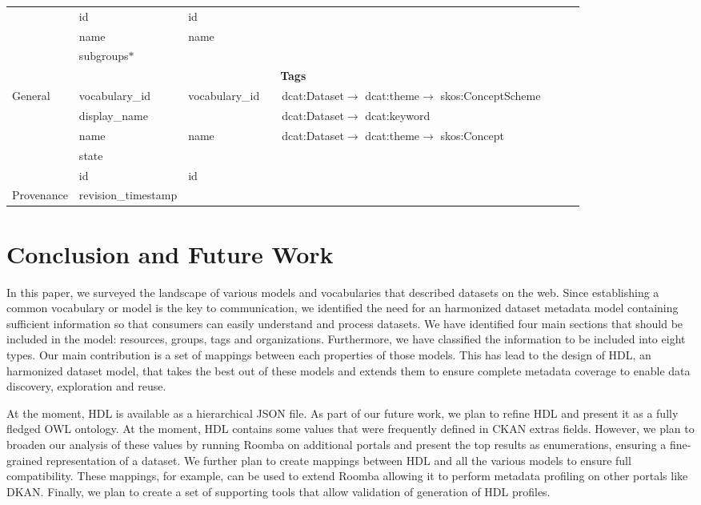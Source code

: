 \documentclass[runningheads,a4paper]{../../Tools/LaTEX/llncs}
\begin{document}
{\begin{landscape}
{\begin{longtable}{|p{1cm}|m{3.1cm}|m{2.4cm}|m{2.5cm}|p{3.8cm}|m{3.8cm}|m{6.5cm}|m{2.5cm}|}
\cline{2-8}
 & id & id &  &  &  &  & \tabularnewline
\cline{2-8}
 & name & name &  &  &  &  & \tabularnewline
\cline{2-8}
 & subgroups$\ast$ &  &  &  &  &  & \tabularnewline
\hline
\multicolumn{8}{|c|}{\cellcolor{blue!25}\textbf{Tags}}\tabularnewline
\hline
\multirow{5}{2cm}{General} & vocabulary\_id & vocabulary\_id &  & dcat:Dataset$\rightarrow$ dcat:theme$\rightarrow$ skos:ConceptScheme &  &  & \tabularnewline
\cline{2-8}
 & display\_name &  &  & dcat:Dataset$\rightarrow$ dcat:keyword &  &  & \tabularnewline
\cline{2-8}
 & name & name &  & dcat:Dataset$\rightarrow$ dcat:theme$\rightarrow$ skos:Concept &  &  & \tabularnewline
\cline{2-8}
 & state &  &  &  &  &  & \tabularnewline
\cline{2-8}
 & id & id &  &  &  &  & \tabularnewline
\hline
Provenance & revision\_timestamp &  &  &  &  &  & \tabularnewline
\hline
\end{longtable}
}
\end{landscape}
\clearpage
\restoregeometry
}


\section{Conclusion and Future Work}
\label{sec:conclusion}
In this paper, we surveyed the landscape of various models and vocabularies that described datasets on the web. Since establishing a common vocabulary or model is the key to communication, we identified the need for an harmonized dataset metadata model containing sufficient information so that consumers can easily understand and process datasets. We have identified four main sections that should be included in the model: resources, groups, tags and organizations. Furthermore, we have classified the information to be included into eight types. Our main contribution is a set of mappings between each properties of those models. This has lead to the design of HDL, an harmonized dataset model, that takes the best out of these models and extends them to ensure complete metadata coverage to enable data discovery, exploration and reuse.

At the moment, HDL is available as a hierarchical JSON file. As part of our future work, we plan to refine HDL and present it as a fully fledged OWL ontology. At the moment, HDL contains some values that were frequently defined in CKAN extras fields. However, we plan to broaden our analysis of these values by running Roomba on additional portals and present the top results as enumerations, ensuring a fine-grained representation of a dataset. We further plan to create mappings between HDL and all the various models to ensure full compatibility. These mappings, for example, can be used to extend Roomba allowing it to perform metadata profiling on other portals like DKAN. Finally, we plan to create a set of supporting tools that allow validation of generation of HDL profiles.
\end{document}
